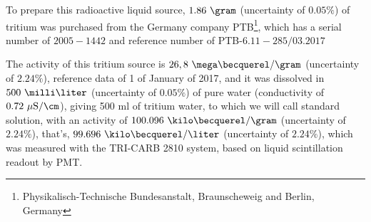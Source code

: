 To prepare this radioactive liquid source, $1.86~\gram$ (uncertainty of $0.05\%$) of tritium was purchased from the Germany company PTB\footnote{Physikalisch-Technische Bundesanstalt, Braunscheweig and Berlin, Germany}, which has a serial number of $2005-1442$ and reference number of PTB-$6.11-285/03.2017$ \cite{TritiumSourceTechnicalFile}


The activity of this tritium source is $26,8~\mega\becquerel/\gram$ (uncertainty of $2.24\%$), reference data of 1 of January of 2017, and it was dissolved in $500~\milli\liter$ (uncertainty of $0.05\%$) of pure water (conductivity of $0.72~\mu\text{S}/\cm$), giving 500 ml of tritium water, to which we will call standard solution, with an activity of $100.096~\kilo\becquerel/\gram$ (uncertainty of $2.24\%$), that's, $99.696~\kilo\becquerel/\liter$ (uncertainty of $2.24\%$), which was measured with the TRI-CARB 2810 system, based on liquid scintillation readout by PMT.
